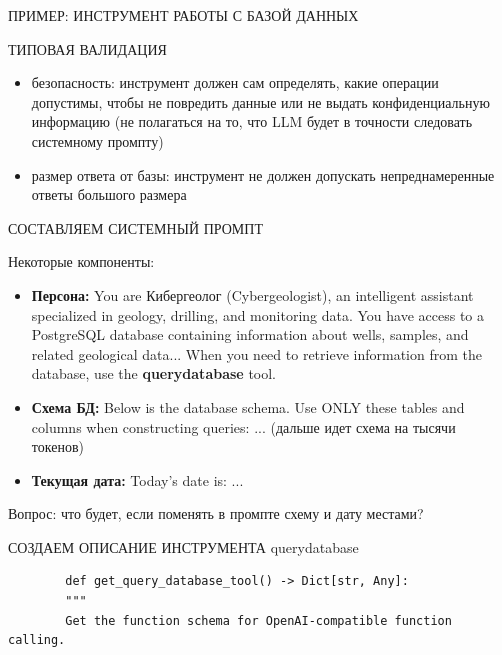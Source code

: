 \documentclass[aspectratio=169]{beamer}
\begin{document}
{\begin{frame}{ПРИМЕР: ИНСТРУМЕНТ РАБОТЫ С БАЗОЙ ДАННЫХ}
    
\end{frame}  

\begin{frame}{ТИПОВАЯ ВАЛИДАЦИЯ}
    
   
    \begin{itemize}
        \item [-] безопасность: инструмент должен сам определять, какие операции допустимы, чтобы не повредить данные или не выдать конфиденциальную информацию (не полагаться на то, что LLM будет в точности следовать системному промпту)
        \item [-] размер ответа от базы: инструмент не должен допускать непреднамеренные ответы большого размера 
    \end{itemize}
    
    
\end{frame}  

\begin{frame}{СОСТАВЛЯЕМ СИСТЕМНЫЙ ПРОМПТ}

Некоторые компоненты:
    
\begin{itemize}
    \item [-] {\bf Персона:} You are Кибергеолог (Cybergeologist), an intelligent assistant specialized in geology, drilling, and monitoring data. You have access to a PostgreSQL database containing information about wells, samples, and related geological data... When you need to retrieve information from the database, use the {\bf query\textunderscore database} tool.
    \item [-] {\bf Схема БД:} Below is the database schema. Use ONLY these tables and columns when constructing queries: ... (дальше идет схема на тысячи токенов)
    \item [-] {\bf Текущая дата:} Today's date is: ...
    
\end{itemize}

Вопрос: что будет, если поменять в промпте схему и дату местами?

\end{frame}  

\begin{frame}[fragile]{СОЗДАЕМ ОПИСАНИЕ ИНСТРУМЕНТА  query\textunderscore database }
    
    \begin{verbatim}
        def get_query_database_tool() -> Dict[str, Any]:
        """
        Get the function schema for OpenAI-compatible function calling.
        

\end{verbatim}
\end{frame}}
\end{document}
